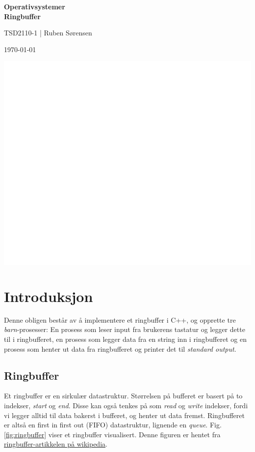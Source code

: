 \documentclass[a4paper, 12pt]{article}
\begin{document}
\pagecolor{USNBlue}\afterpage{\nopagecolor}
\begin{titlepage}
    \centering
    {\color{white}%
    \vspace*{\fill}

    {\fontsize{35}{40}\bfseries
    \selectfont Operativsystemer\\[0.5ex]
    \fontsize{50}{60}\bfseries
    \selectfont Ringbuffer}

    \vspace*{0.5cm}
    {\fontsize{25}{25}\selectfont TSD2110-1 | Ruben Sørensen}

    \vspace*{0.25cm}
    \normalsize \today

    \vspace*{\fill}
    \includegraphics[]{res/USN.png}
    }
    \end{titlepage}
    \clearpage

    \tableofcontents
    \clearpage

    \section{Introduksjon}
    Denne obligen består av å implementere et ringbuffer i C++, og opprette tre \textit{barn}-prosesser: En prosess som leser input fra brukerens tastatur og legger dette til i ringbufferet, en prosess som legger data fra en string inn i ringbufferet og en prosess som henter ut data fra ringbufferet og printer det til \textit{standard output}.
    \subsection{Ringbuffer}
    Et ringbuffer er en sirkulær datastruktur. Størrelsen på bufferet er basert på to indekser, \textit{start} og \textit{end}. Disse kan også tenkes på som \textit{read} og \textit{write} indekser, fordi vi legger alltid til data bakerst i bufferet, og henter ut data fremst. Ringbufferet er altså en first in first out (FIFO) datastruktur, lignende en \textit{queue}. Fig. \ref{fig:ringbuffer} viser et ringbuffer visualisert. Denne figuren er hentet fra {\color{cyan}\href{https://en.wikipedia.org/wiki/Circular_buffer}{ringbuffer-artikkelen på wikipedia}}.
\end{document}
